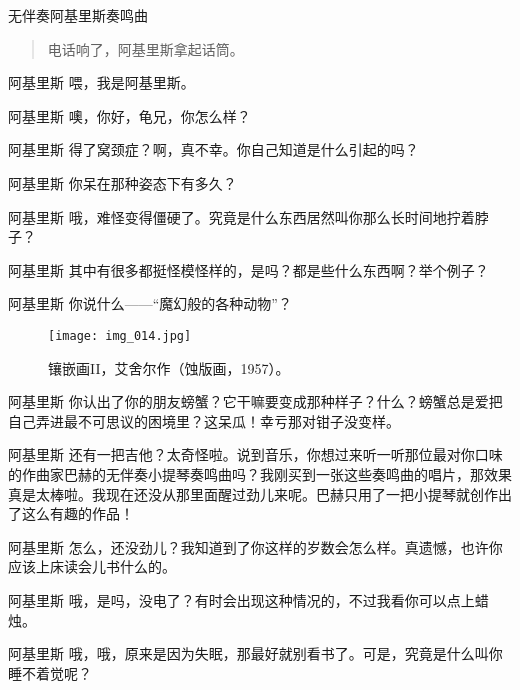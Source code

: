 
\begin{dialog}{无伴奏阿基里斯奏鸣曲}

\begin{quote}
电话响了，阿基里斯拿起话筒。
\end{quote}

\begin{dialogue}

\item[阿基里斯]喂，我是阿基里斯。

\item[阿基里斯]噢，你好，龟兄，你怎么样？

\item[阿基里斯]得了窝颈症？啊，真不幸。你自己知道是什么引起的吗？

\item[阿基里斯]你呆在那种姿态下有多久？

\item[阿基里斯]哦，难怪变得僵硬了。究竟是什么东西居然叫你那么长时间地拧着脖子？

\item[阿基里斯]其中有很多都挺怪模怪样的，是吗？都是些什么东西啊？举个例子？

\item[阿基里斯]你说什么——“魔幻般的各种动物”？

\begin{figure}
\texttt{[image: img\_014.jpg]}
\caption[镶嵌画II，艾舍尔作。]
  {镶嵌画II，艾舍尔作（蚀版画，1957）。}
\end{figure}

\item[阿基里斯]你认出了你的朋友螃蟹？它干嘛要变成那种样子？什么？螃蟹总是爱把自己弄进最不可思议的困境里？这呆瓜！幸亏那对钳子没变样。

\item[阿基里斯]还有一把吉他？太奇怪啦。说到音乐，你想过来听一听那位最对你口味的作曲家巴赫的无伴奏小提琴奏鸣曲吗？我刚买到一张这些奏鸣曲的唱片，那效果真是太棒啦。我现在还没从那里面醒过劲儿来呢。巴赫只用了一把小提琴就创作出了这么有趣的作品！

\item[阿基里斯]怎么，还没劲儿？我知道到了你这样的岁数会怎么样。真遗憾，也许你应该上床读会儿书什么的。

\item[阿基里斯]哦，是吗，没电了？有时会出现这种情况的，不过我看你可以点上蜡烛。

\item[阿基里斯]哦，哦，原来是因为失眠，那最好就别看书了。可是，究竟是什么叫你睡不着觉呢？


\end{dialogue}
\end{dialog}
